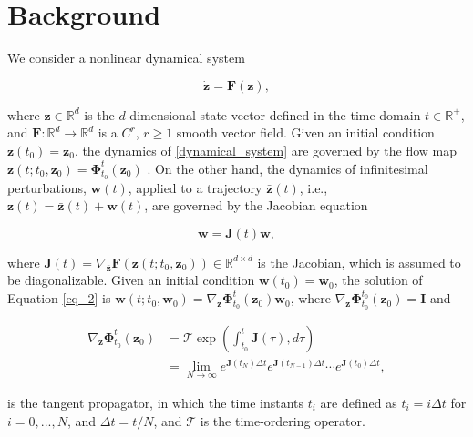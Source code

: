 \documentclass[aps,reprint,prx]{revtex4-2}
\begin{document}
\section{\label{section:setup}Background}
We consider a nonlinear dynamical system

\begin{equation} \label{dynamical_system}
\dot{\mathbf{z}} = \mathbf{F}(\mathbf{z}),
\end{equation}

where $\mathbf{z} \in \mathbb{R}^d$ is the $d$-dimensional state vector defined in the time domain $t \in \mathbb{R}^+$, and $\mathbf{F}: \mathbb{R}^d \rightarrow \mathbb{R}^d$ is a $C^r$, $r \geq 1$ smooth vector field. Given an initial condition $\mathbf{z}(t_0) = \mathbf{z}_0$, the dynamics of \eqref{dynamical_system} are governed by the flow map $\mathbf{z}(t; t_0, \mathbf{z}_0) = \mathbf{\Phi}_{t_0}^{t}(\mathbf{z}_0)$ \cite{arnoldOrdinaryDifferentialEquations1992}. On the other hand, the dynamics of infinitesimal perturbations, $\mathbf{w}(t)$, applied to a trajectory $\bar{\mathbf{z}}(t)$, i.e., $\mathbf{z}(t) = \bar{\mathbf{z}}(t) + \mathbf{w}(t)$, are governed by the Jacobian equation

\begin{equation} \label{eq_2}
\dot{\mathbf{w}} = \mathbf{J}(t) \mathbf{w},
\end{equation}

where $\mathbf{J}(t) = \nabla_{\bar{\mathbf{z}}}\mathbf{F}(\mathbf{z}(t; t_0, \mathbf{z}_0)) \in \mathbb{R}^{d \times d}$ is the Jacobian, which is assumed to be diagonalizable. Given an initial condition $\mathbf{w}(t_0) = \mathbf{w}_0$, the solution of Equation \eqref{eq_2} is $\mathbf{w}(t; t_0, \mathbf{w}_0) = \nabla_\mathbf{z}\mathbf{\Phi}_{t_0}^t(\mathbf{z}_0) \mathbf{w}_0$, where $\nabla_{\mathbf{z}}\mathbf{\Phi}_{t_0}^{t_0}(\mathbf{z}_0) = \mathbf{I}$ and

\begin{align}
\nabla_{\mathbf{z}}\mathbf{\Phi}_{t_0}^{t}(\mathbf{z}_0) \nonumber 
&= \mathcal{T}\exp\left( \int_{t_0}^t \mathbf{J}(\tau) , d\tau \right) \nonumber \\ & = \lim_{N \to \infty}e^{\mathbf{J}(t_N)\Delta t} e^{\mathbf{J}(t_{N-1})\Delta t} \cdots e^{\mathbf{J}(t_0)\Delta t},
\label{eq:timeorderedexponential}
\end{align}

is the tangent propagator, in which the time instants $t_i$ are defined as $t_i = i \Delta t$ for $i = 0,...,N$, and $\Delta t = t / N$, and $\mathcal{T}$ is the time-ordering operator.
\end{document}
